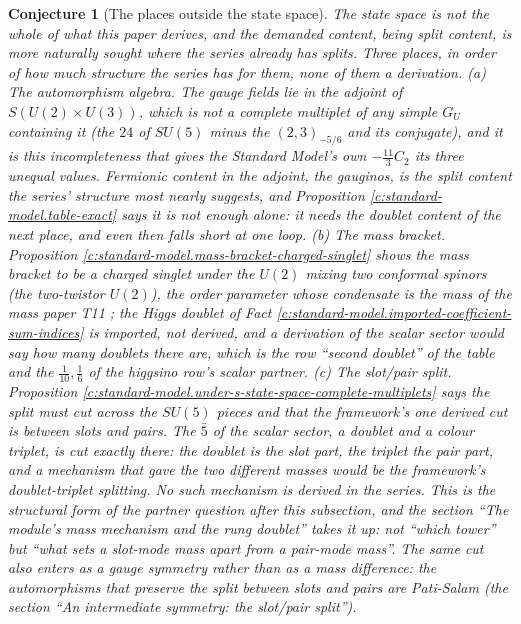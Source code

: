 \documentclass[11pt]{article}
\newtheorem{conjecture}[theorem]{Conjecture}
\theoremstyle{definition}
\theoremstyle{plain}
\newcommand{\changedmark}[2]{\marginpar{\raggedright\scriptsize\color{#1}#2}}
\begin{document}
\begin{conjecture}[The places outside the state space]\label{c:standard-model.places-outside-state-space}
\changedmark{gray}{reworded}
The state space is not the whole of what this paper derives, and the demanded content, being split content, is more naturally sought where the series already has splits. Three places, in order of how much structure the series has for them, none of them a derivation. (a) \emph{The automorphism algebra.} The gauge fields lie in the adjoint of $S(U(2) \times U(3))$, which is not a complete multiplet of any simple $G_{U}$ containing it (the $24$ of $SU(5)$ minus the $(2,3)_{-5/6}$ and its conjugate), and it is this incompleteness that gives the Standard Model's own $-\tfrac{11}{3}C_{2}$ its three unequal values. Fermionic content in the adjoint, the gauginos, is the split content the series' structure most nearly suggests, and Proposition \ref{c:standard-model.table-exact} says it is not enough alone: it needs the doublet content of the next place, and even then falls short at one loop. (b) \emph{The mass bracket.} Proposition \ref{c:standard-model.mass-bracket-charged-singlet} shows the mass bracket to be a charged singlet under the $U(2)$ mixing two conformal spinors (the two-twistor $U(2)$), the order parameter whose condensate is the mass of the mass paper T11 \cite{ButlerT11}; the Higgs doublet of Fact \ref{c:standard-model.imported-coefficient-sum-indices} is imported, not derived, and a derivation of the scalar sector would say how many doublets there are, which is the row ``second doublet'' of the table and the $\tfrac{1}{10}, \tfrac16$ of the higgsino row's scalar partner. (c) \emph{The slot/pair split.} Proposition \ref{c:standard-model.under-s-state-space-complete-multiplets} says the split must cut across the $SU(5)$ pieces and that the framework's one derived cut is between slots and pairs. The $\bar{5}$ of the scalar sector, a doublet and a colour triplet, is cut exactly there: the doublet is the slot part, the triplet the pair part, and a mechanism that gave the two different masses would be the framework's doublet-triplet splitting. No such mechanism is derived in the series. This is the structural form of the partner question after this subsection, and the section ``The module's mass mechanism and the rung doublet'' takes it up: not ``which tower'' but ``what sets a slot-mode mass apart from a pair-mode mass''. The same cut also enters as a gauge symmetry rather than as a mass difference: the automorphisms that preserve the split between slots and pairs are Pati-Salam (the section ``An intermediate symmetry: the slot/pair split'').
\end{conjecture}
\end{document}
